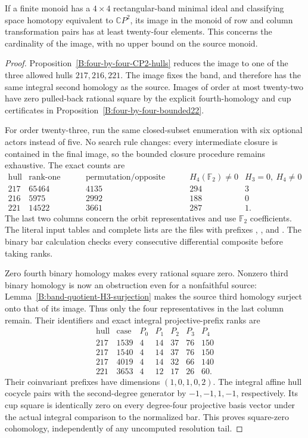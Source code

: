 \begin{proposition}
\label{B:four-by-four-image24}
If a finite monoid has a $4\times4$ rectangular-band minimal
ideal and classifying space homotopy equivalent to $\mathbb CP^2$,
its image in the monoid of row and column transformation pairs
has at least twenty-four elements.  This concerns the cardinality
of the image, with no upper bound on the source monoid.
\end{proposition}
\begin{proof}
Proposition~\ref{B:four-by-four-CP2-hulls} reduces the image to
one of the three allowed hulls $217,216,221$.  The image fixes
the band, and therefore has the same integral second homology
as the source.  Images of order at most twenty-two have zero
pulled-back rational square by the explicit fourth-homology and
cup certificates in Proposition~\ref{B:four-by-four-bounded22}.

For order twenty-three, run the same closed-subset enumeration
with six optional actors instead of five.  No search rule changes:
every intermediate closure is contained in the final image, so
the bounded closure procedure remains exhaustive.  The exact
counts are
\[
 \begin{array}{c|r|r|r|r}
 \text{hull}&\text{rank-one images}&\text{permutation/opposite orbits}
 &H_4(\mathbb F_2)\ne0&H_3=0,\ H_4\ne0\\\hline
 217&65464&4135&294&3\\
 216&5975&2992&188&0\\
 221&14522&3661&287&1.
 \end{array}
\]
The last two columns concern the orbit representatives and use
$\mathbb F_2$ coefficients.  The literal input tables and
complete lists are the files with prefixes
,
, and
.
The binary bar calculation checks every consecutive differential
composite before taking ranks.

Zero fourth binary homology makes every rational square zero.
Nonzero third binary homology is now an obstruction even for
a nonfaithful source: Lemma~\ref{B:band-quotient-H3-surjection}
makes the source third homology surject onto that of its image.
Thus only the four representatives in the last column remain.
Their identifiers and exact integral projective-prefix ranks are
\[
 \begin{array}{c|c|ccccc}
 \text{hull}&\text{case}&P_0&P_1&P_2&P_3&P_4\\\hline
 217&1539&4&14&37&76&150\\
 217&1540&4&14&37&76&150\\
 217&4019&4&14&32&66&140\\
 221&3653&4&12&17&26&60.
 \end{array}
\]
Their coinvariant prefixes have dimensions $(1,0,1,0,2)$.
The integral affine hull cocycle pairs with the second-degree
generator by $-1,-1,1,-1$, respectively.  Its cup square is
identically zero on every degree-four projective basis vector
under the actual integral comparison to the normalized bar.
This proves square-zero cohomology, independently of any
uncomputed resolution tail.


\end{proof}
